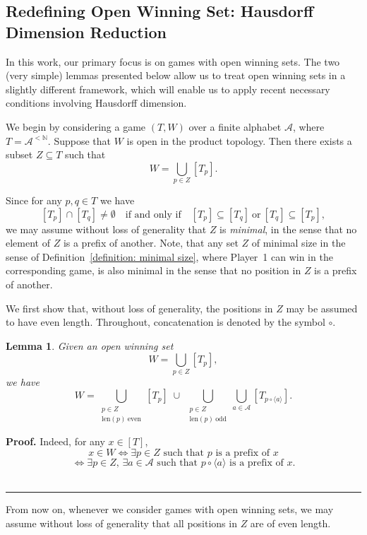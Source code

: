 \documentclass[a4,12pt]{article}%
\newtheorem{lemma}[theorem]{Lemma}
\newenvironment{proof}[1][Proof]{\textbf{#1.} }{\ \rule{0.5em}{0.5em}}
\begin{document}
\subsection{Redefining Open Winning Set: Hausdorff Dimension Reduction}
In this work, our primary focus is on games with open winning sets. The two (very simple) lemmas presented below allow us to treat open winning sets in a slightly different framework, which will enable us to apply recent necessary conditions involving Hausdorff dimension.

We begin by considering a game $(T,W)$ over a finite alphabet $\mathcal{A}$, where $T=\mathcal{A}^{<\mathbb{N}}$. Suppose that $W$ is open in the product topology. Then there exists a subset $Z\subseteq T$ such that
\[
W=\bigcup_{p\in Z}[T_p].
\]

Since for any $p,q\in T$ we have
\[
[T_p]\cap[T_q]\neq\emptyset
\quad\text{if and only if}\quad
[T_p]\subseteq[T_q]\ \text{or}\ [T_q]\subseteq[T_p],
\]
we may assume without loss of generality that $Z$ is \emph{minimal}, in the sense that no element of $Z$ is a prefix of another. Note, that any set $Z$ of minimal size in the sense of Definition~\ref{definition: minimal size}, where Player~1 can win in the corresponding game, is also minimal in the sense that no position in $Z$ is a prefix of another.

We first show that, without loss of generality, the positions in $Z$ may be assumed to have even length. Throughout, concatenation is denoted by the symbol $\circ$.

\begin{lemma} \label{lemma: can ssume even lengths}
Given an open winning set 
\[
W = \bigcup_{p\in Z} [T_p],
\] 
we have
\[
W = 
\bigcup_{\substack{p\in Z \\ \mathrm{len}(p)\ \text{even}}} [T_p] 
\;\cup\;
\bigcup_{\substack{p\in Z \\ \mathrm{len}(p)\ \text{odd}}} 
\bigcup_{a \in \mathcal{A}} [T_{p \circ \langle a \rangle}].
\]
\end{lemma}

\begin{proof}
Indeed, for any $x \in [T]$,
\[
x \in W \iff \exists p \in Z \text{ such that } p \text{ is a prefix of } x
\]
\[
\iff \exists p \in Z,\, \exists a \in \mathcal{A} \text{ such that } p \circ \langle a \rangle \text{ is a prefix of } x.
\]
\end{proof}

\medskip

From now on, whenever we consider games with open winning sets, we may assume without loss of generality that all positions in $Z$ are of even length.
\end{document}
